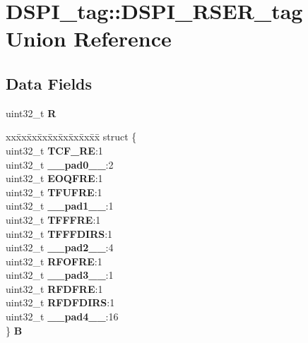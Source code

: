 \hypertarget{unionDSPI__tag_1_1DSPI__RSER__tag}{}\section{D\+S\+P\+I\+\_\+tag\+::D\+S\+P\+I\+\_\+\+R\+S\+E\+R\+\_\+tag Union Reference}
\label{unionDSPI__tag_1_1DSPI__RSER__tag}
\subsection*{Data Fields}
\begin{DoxyCompactItemize}
\item 
\mbox{\label{unionDSPI__tag_1_1DSPI__RSER__tag_ad3acf8631b138a0834c3d632d18e79dc}} 
uint32\+\_\+t {\bfseries R}
\item 
\mbox{\label{unionDSPI__tag_1_1DSPI__RSER__tag_a6e1c54a97df01ebcf4026689ffc89585}} 
\begin{tabbing}
xx\=xx\=xx\=xx\=xx\=xx\=xx\=xx\=xx\=\kill
struct \{\\
\>uint32\_t {\bfseries TCF\_RE}:1\\
\>uint32\_t {\bfseries \_\_pad0\_\_}:2\\
\>uint32\_t {\bfseries EOQFRE}:1\\
\>uint32\_t {\bfseries TFUFRE}:1\\
\>uint32\_t {\bfseries \_\_pad1\_\_}:1\\
\>uint32\_t {\bfseries TFFFRE}:1\\
\>uint32\_t {\bfseries TFFFDIRS}:1\\
\>uint32\_t {\bfseries \_\_pad2\_\_}:4\\
\>uint32\_t {\bfseries RFOFRE}:1\\
\>uint32\_t {\bfseries \_\_pad3\_\_}:1\\
\>uint32\_t {\bfseries RFDFRE}:1\\
\>uint32\_t {\bfseries RFDFDIRS}:1\\
\>uint32\_t {\bfseries \_\_pad4\_\_}:16\\
\} {\bfseries B}\\


\end{tabbing}
\end{DoxyCompactItemize}
